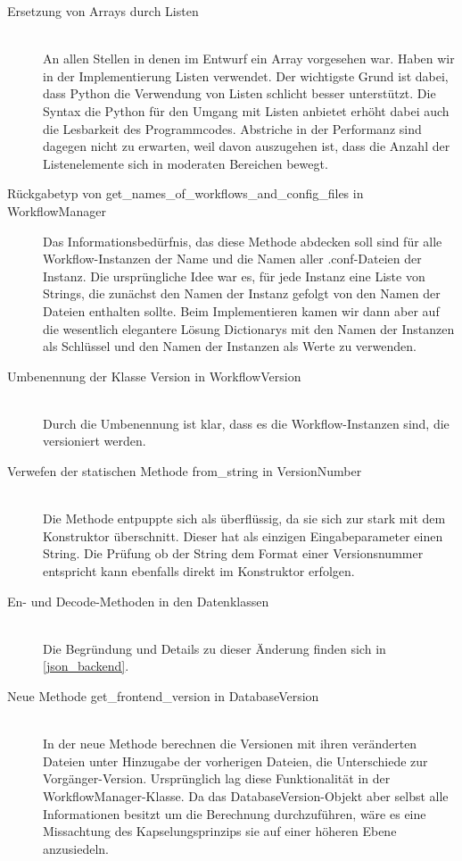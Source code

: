 \begin{description}
\item[Ersetzung von Arrays durch Listen]\hfill \\
An allen Stellen in denen im Entwurf ein Array vorgesehen war. Haben wir in der Implementierung Listen verwendet. Der wichtigste Grund ist dabei, dass Python die Verwendung von Listen schlicht besser unterstützt. Die Syntax die Python für den Umgang mit Listen anbietet erhöht dabei auch die Lesbarkeit des Programmcodes. Abstriche in der Performanz sind dagegen nicht zu erwarten, weil davon auszugehen ist, dass die Anzahl der Listenelemente sich in moderaten Bereichen bewegt.
\item[Rückgabetyp von get\_names\_of\_workflows\_and\_config\_files in WorkflowManager]\hfill
Das Informationsbedürfnis, das diese Methode abdecken soll sind für alle Workflow-Instanzen der Name und die Namen aller \glqq .conf\grqq{}-Dateien der Instanz. Die ursprüngliche Idee war es, für jede Instanz eine Liste von Strings, die zunächst den Namen der Instanz gefolgt von den Namen der Dateien enthalten sollte. Beim Implementieren kamen wir dann aber auf die wesentlich elegantere Lösung Dictionarys mit den Namen der Instanzen als Schlüssel und den Namen der Instanzen als Werte zu verwenden.
\item[Umbenennung der Klasse Version in WorkflowVersion]\hfill \\
Durch die Umbenennung ist klar, dass es die Workflow-Instanzen sind, die versioniert werden.
\item[Verwefen der statischen Methode from\_string in VersionNumber]\hfill \\
Die Methode entpuppte sich als überflüssig, da sie sich zur stark mit dem Konstruktor überschnitt. Dieser hat als einzigen Eingabeparameter einen String. Die Prüfung ob der String dem Format einer Versionsnummer entspricht kann ebenfalls direkt im Konstruktor erfolgen.
\item[En- und Decode-Methoden in den Datenklassen]\hfill \\
Die Begründung und Details zu dieser Änderung finden sich in \ref{json_backend}.
\item[Neue Methode get\_frontend\_version in DatabaseVersion]\label{get_f_version}\hfill \\
In der neue Methode berechnen die Versionen mit ihren veränderten Dateien unter Hinzugabe der vorherigen Dateien, die Unterschiede zur Vorgänger-Version. Ursprünglich lag diese Funktionalität in der WorkflowManager-Klasse. Da das DatabaseVersion-Objekt aber selbst alle Informationen besitzt um die Berechnung durchzuführen, wäre es eine Missachtung des Kapselungsprinzips sie auf einer höheren Ebene anzusiedeln.

\end{description}
